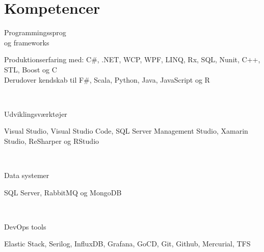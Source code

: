 \documentclass[10pt, a4paper]{article}
\begin{document}
\section{Kompetencer}
\begin{Row}%
  \begin{Cell}{1}
    Programmingssprog \\[1ex]
    og frameworks
  \end{Cell}
  \begin{Cell}{3}
    Produktionserfaring med: C\#, .NET, WCP, WPF, LINQ, Rx, SQL, Nunit,  %
    C++, STL, Boost og C \\
    Derudover kendskab til F\#, Scala, Python, Java, JavaScript og R
  \end{Cell}
\end{Row}
\\[0.5cm]
\begin{Row}%
  \begin{Cell}{1}
    Udviklingsværktøjer
  \end{Cell}
  \begin{Cell}{3}
    Visual Studio, Visual Studio Code, SQL Server Management Studio, Xamarin
    Studio, ReSharper og RStudio
  \end{Cell}
\end{Row}
\\[0.5cm]
\begin{Row}%
  \begin{Cell}{1}
    Data systemer
  \end{Cell}
  \begin{Cell}{3}
    SQL Server, RabbitMQ og MongoDB
  \end{Cell}
\end{Row}
\\[0.5cm]\begin{Row}%
  \begin{Cell}{1}
    DevOps tools
  \end{Cell}
  \begin{Cell}{3}
    Elastic Stack, Serilog, InfluxDB, Grafana, GoCD, Git, Github, Mercurial, TFS
  \end{Cell}
\end{Row}
\end{document}

